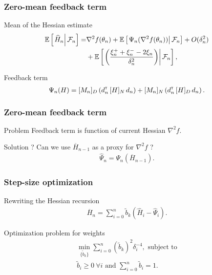 \begin{frame}
\begin{small}
\frametitle{\centering Zero-mean feedback term}
\begin{block}{Mean of the  Hessian estimate}
\begin{align}
 \mathbb{E}\left[\left.\widehat H_n\right| \mathcal{F}_n\right] = & \nabla^2 f(\theta_n) + \mathbb{E}\left[\left.\Psi_{n}(\nabla^2 f(\theta_n))\right| \mathcal{F}_n\right]  +  O(\delta_n^2)\nonumber\\
&+\mathbb{E}\left[\left.\left(\dfrac{\xi_n^+ + \xi_n^- - 2 \xi_n}{\delta_n^2} \right)\right| \mathcal{F}_n\right], \label{eq:hnhat}
\end{align}
\end{block}
\begin{block}{Feedback term}
\begin{align}
\Psi_{n}(H) =  [M_n]_{D}\left(d_{n}^\mathsf{\scriptscriptstyle T} \, [H]_{N} \, d_{n}\right) +  [M_n]_{N}\left(d_{n}^\mathsf{\scriptscriptstyle T} \, [H]_{D} \, d_{n}\right).\label{eq:psi}
\end{align}
\end{block}
\end{small}
\end{frame}

\begin{frame}
\begin{small}
\frametitle{\centering Zero-mean feedback term}
\begin{block}{Problem}
Feedback term is function of current Hessian  $\nabla^2 f$.
\end{block}
\begin{block}{Solution ?}
Can we use $\overline H_{n-1}$ as a proxy for $\nabla^2 f$ ?
\begin{align}
\widehat \Psi_n = \Psi_{n} (\overline H_{n-1}).
\label{eq:psinhat}
\end{align}
\end{block}
\end{small}
\end{frame}

\begin{frame}
\begin{small}
\frametitle{\centering Step-size optimization}
\begin{block}{Rewriting the Hessian recursion}
\begin{align}
\label{eq:hess}
\overline H_n = \sum\limits_{i=0}^{n} \tilde b_k(\widehat H_i -\widehat \Psi_i).
\end{align}
\end{block}
\begin{block}{Optimization problem for weights}
\begin{align}
\min_{ \{\tilde b_k\} } \sum \limits_{i=0}^{n} (\tilde b_k)^2 \delta_i^{-4}, \text{ subject to} \label{eq:wn-opt}\\
\tilde b_i \geq 0 ~\forall i \text{ and }\sum \limits_{i=0}^{n} \tilde b_i = 1.
\end{align}
\end{block}
\end{small}
\end{frame}

